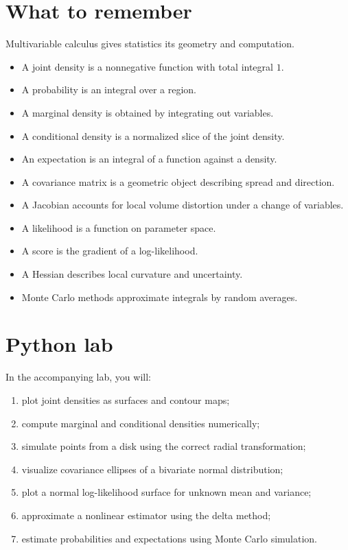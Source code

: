 \documentclass[11pt,oneside]{book}
\begin{document}
\section{What to remember}

Multivariable calculus gives statistics its geometry and computation.
\begin{itemize}
  \item A joint density is a nonnegative function with total integral $1$.
  \item A probability is an integral over a region.
  \item A marginal density is obtained by integrating out variables.
  \item A conditional density is a normalized slice of the joint density.
  \item An expectation is an integral of a function against a density.
  \item A covariance matrix is a geometric object describing spread and direction.
  \item A Jacobian accounts for local volume distortion under a change of variables.
  \item A likelihood is a function on parameter space.
  \item A score is the gradient of a log-likelihood.
  \item A Hessian describes local curvature and uncertainty.
  \item Monte Carlo methods approximate integrals by random averages.
\end{itemize}

\section{Python lab}

In the accompanying lab, you will:
\begin{enumerate}
  \item plot joint densities as surfaces and contour maps;
  \item compute marginal and conditional densities numerically;
  \item simulate points from a disk using the correct radial transformation;
  \item visualize covariance ellipses of a bivariate normal distribution;
  \item plot a normal log-likelihood surface for unknown mean and variance;
  \item approximate a nonlinear estimator using the delta method;
  \item estimate probabilities and expectations using Monte Carlo simulation.
\end{enumerate}
\end{document}
